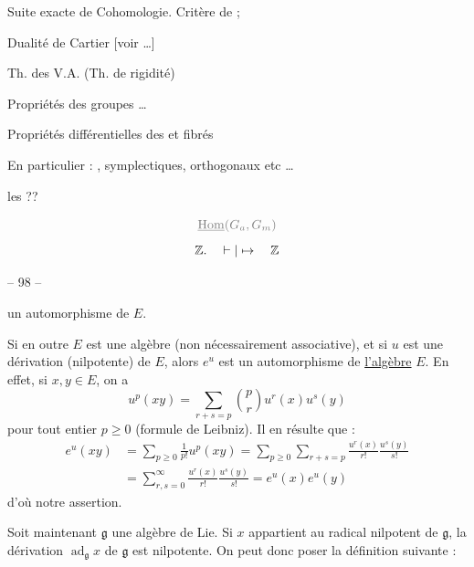 Suite exacte de Cohomologie. Critère de ;


Dualité de Cartier [voir \ldots]

Th.  des V.A. (Th. de rigidité)

Propriétés  des groupes \ldots

Propriétés différentielles des  et fibrés

En particulier : , symplectiques, orthogonaux etc \ldots


  les  ??

\[
\deleted{\underline{\operatorname{Hom}}(G_a,G_m)}
\]
\[
\mathbb Z.\quad\vdash|\mapsto\quad\mathbb Z
\]


\begin{center}-- 98 --\end{center}

un automorphisme de $E$.

Si en outre $E$ est une algèbre (non nécessairement associative), et si $u$ est une dérivation (nilpotente) de $E$, alors $e^u$ est un automorphisme de \uline{l'algèbre} $E$. En effet, si $x,y\in E$, on a
\[
u^p(xy)=\sum_{r+s=p}\binom{p}{r}u^r(x)u^s(y)
\]
pour tout entier $p\geq0$ (formule de Leibniz). Il en résulte que :
\[
\begin{aligned}
e^u(xy)&=\sum_{p\geq0}\frac{1}{p!}u^p(xy)=\sum_{p\geq0}\sum_{r+s=p}\frac{u^r(x)}{r!}\frac{u^s(y)}{s!}\\
&=\sum_{r,s=0}^\infty\frac{u^r(x)}{r!}\frac{u^s(y)}{s!}=e^u(x)e^u(y)
\end{aligned}
\]
d'où notre assertion.

Soit maintenant $\mathfrak g$ une algèbre de Lie. Si $x$ appartient au radical nilpotent de $\mathfrak g$, la dérivation $\operatorname{ad}_{\mathfrak g}x$ de $\mathfrak g$ est nilpotente. On peut donc poser la définition suivante :

